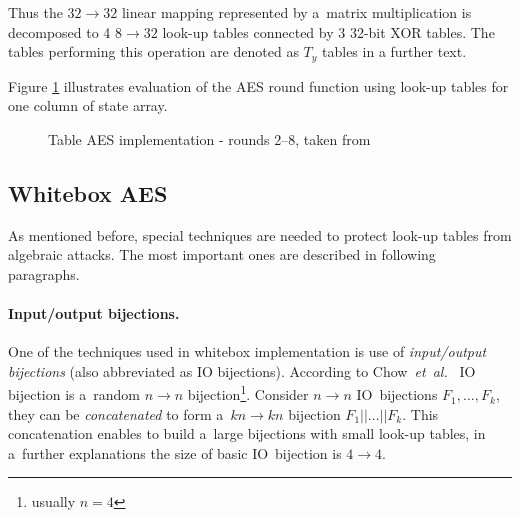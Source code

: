 \documentclass[11pt,oneside,final]{fithesis2}
\newcommand{\eal}{\emph{et~al.}}
\begin{document}
    Thus the $32\rightarrow32$ linear mapping represented by a~matrix multiplication is decomposed to 4 $8\rightarrow32$ look-up tables
    connected by 3 32-bit XOR tables. The tables performing this operation are denoted as $T_y$ tables in a further text.

    Figure \ref{fig:table_aes} illustrates evaluation of the AES round function using look-up tables for one column of state array.

    \begin{figure}[!htb]
    \begin{center}
    \leavevmode
    \centerline{}
    \end{center}
    \caption{Table AES implementation - rounds 2--8, taken from \citep{Muir_atutorial}}
    \label{fig:table_aes}
    \end{figure}
    
    \subsection{Whitebox AES}\label{sec:whitebox_aes_scheme_chow}
    As mentioned before, special techniques are needed to protect look-up tables from algebraic attacks. The most important ones 
    are described in following paragraphs.
    
    \paragraph*{Input/output bijections.}
    One of the techniques used in whitebox implementation is use of \emph{input/output bijections} (also abbreviated as IO bijections).
    According to Chow~\eal~\citep{Chow02white-boxcryptography} IO bijection is a~random $n\rightarrow n$ bijection\footnote{usually $n=4$}. 
    Consider $n\rightarrow n$ IO~bijections $F_1,\dots,F_k$, they can be \emph{concatenated} to form a~$kn \rightarrow kn$ bijection 
    $F_1||\dots || F_k$. This concatenation enables to build a~large bijections with small look-up tables, in a~further explanations the size of basic 
    IO~bijection is $4 \rightarrow 4$.
    
\end{document}
